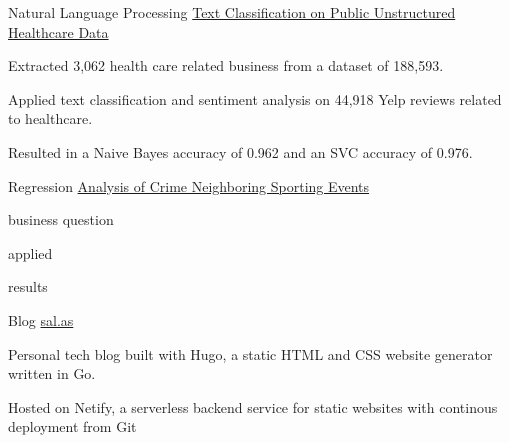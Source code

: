 

\begin{cventries}

  \cventrynodate
    {Natural Language Processing} %
    {\href{https://github.com/franksalas/text_classification_public_healthcare_data}{Text Classification on Public Unstructured Healthcare Data}}
    {} %
    {}
    {
      \begin{cvitems} %
        \item {Extracted 3,062 health care related business from a dataset of 188,593.}
        \item {Applied text classification and sentiment analysis on  44,918 Yelp reviews related to healthcare.}
        \item {Resulted in a Naive Bayes accuracy of 0.962 and an SVC accuracy of 0.976.}
      \end{cvitems}
    }



  \cventrynodate
    {Regression} %
    {\href{https://github.com/franksalas/SpringboardCapstone}{Analysis of Crime Neighboring Sporting Events}} %
    {} %
    {} %
    {
      \begin{cvitems} %
        \item {business question}
        \item {applied}
        \item {results}
      \end{cvitems}
    }

  \cventrynodate
    {Blog} %
    {\href{https://github.com/franksalas/blog}{sal.as}} %
    {} %
    {} %
    {
      \begin{cvitems} %
        \item {Personal tech blog built with Hugo, a static HTML and CSS website generator written in Go.}
        \item {Hosted on Netify, a serverless backend service for static websites with continous deployment from Git}
      \end{cvitems}
    }
	\vspace*{-4mm}
\end{cventries}

